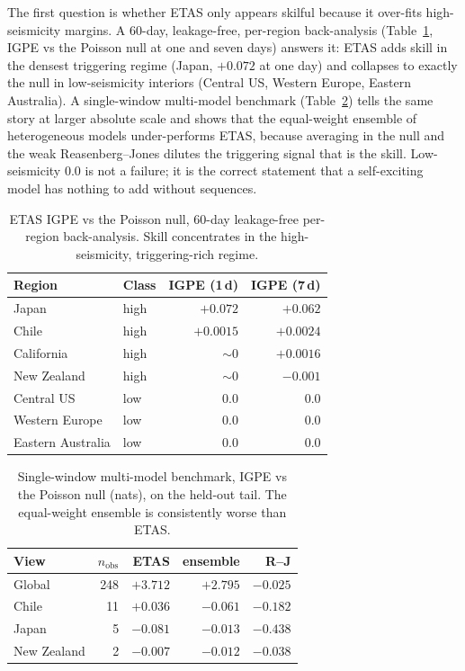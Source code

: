 \documentclass[journal]{IEEEtran}
\begin{document}
The first question is whether ETAS only appears skilful because it over-fits
high-seismicity margins. A 60-day, leakage-free, per-region back-analysis
(Table~\ref{tab:bias}, IGPE vs the Poisson null at one and seven days) answers it: ETAS adds
skill in the densest triggering regime (Japan, $+0.072$ at one day) and collapses to exactly
the null in low-seismicity interiors (Central US, Western Europe, Eastern Australia). A
single-window multi-model benchmark (Table~\ref{tab:bench}) tells the same story at larger
absolute scale and shows that the equal-weight ensemble of heterogeneous models
under-performs ETAS, because averaging in the null and the weak Reasenberg--Jones dilutes the
triggering signal that is the skill. Low-seismicity $0.0$ is not a failure; it is the correct
statement that a self-exciting model has nothing to add without sequences.

\begin{table}[!t]
\caption{ETAS IGPE vs the Poisson null, 60-day leakage-free per-region back-analysis. Skill
concentrates in the high-seismicity, triggering-rich regime.}
\label{tab:bias}
\centering
\begin{tabular}{llrr}
\toprule
Region & Class & IGPE (1\,d) & IGPE (7\,d) \\
\midrule
Japan & high & $+0.072$ & $+0.062$ \\
Chile & high & $+0.0015$ & $+0.0024$ \\
California & high & $\sim0$ & $+0.0016$ \\
New Zealand & high & $\sim0$ & $-0.001$ \\
Central US & low & $0.0$ & $0.0$ \\
Western Europe & low & $0.0$ & $0.0$ \\
Eastern Australia & low & $0.0$ & $0.0$ \\
\bottomrule
\end{tabular}
\end{table}

\begin{table}[!t]
\caption{Single-window multi-model benchmark, IGPE vs the Poisson null (nats), on the
held-out tail. The equal-weight ensemble is consistently worse than ETAS.}
\label{tab:bench}
\centering
\begin{tabular}{lrrrr}
\toprule
View & $n_\text{obs}$ & ETAS & ensemble & R--J \\
\midrule
Global & 248 & $+3.712$ & $+2.795$ & $-0.025$ \\
Chile & 11 & $+0.036$ & $-0.061$ & $-0.182$ \\
Japan & 5 & $-0.081$ & $-0.013$ & $-0.438$ \\
New Zealand & 2 & $-0.007$ & $-0.012$ & $-0.038$ \\
\bottomrule
\end{tabular}
\end{table}
\end{document}

